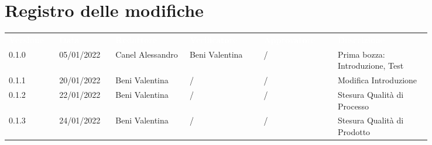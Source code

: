 \section*{Registro delle modifiche}

{\renewcommand{\arraystretch}{1.5}
\scriptsize
\begin{tabular}{p{0.10\linewidth}p{0.10\linewidth}p{0.15\linewidth}p{0.15\linewidth}p{0.15\linewidth}p{0.19\linewidth}}
	\rowcolor[RGB]{33, 73, 50}
	\textcolor{white}{\textbf{Versione}} & \textcolor{white}{\textbf{Data}} &
	\textcolor{white}{\textbf{Redattore}} & \textcolor{white}{\textbf{Verificatore}} &
	\textcolor{white}{\textbf{Approvatore}} & \textcolor{white}{\textbf{Descrizione}}\\
	\rowcolor[RGB]{216, 235, 171}
	0.1.0 & 05/01/2022 & Canel Alessandro& Beni Valentina &/& Prima bozza: Introduzione, Test\\
	\rowcolor[RGB]{233, 245, 206}
	0.1.1 & 20/01/2022 & Beni Valentina& / &/& Modifica Introduzione\\
	\rowcolor[RGB]{216, 235, 171}
	0.1.2 & 22/01/2022 & Beni Valentina& / &/& Stesura Qualità di Processo\\
	\rowcolor[RGB]{233, 245, 206}
	0.1.3 & 24/01/2022 & Beni Valentina& / &/& Stesura Qualità di Prodotto\\
\end{tabular}
}

